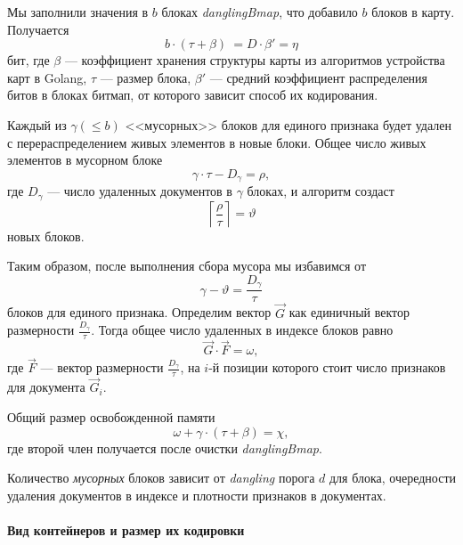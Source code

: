Мы заполнили значения в $b$ блоках \textit{danglingBmap}, что добавило $b$ блоков в карту.
Получается 
\begin{equation}
    \label{eta}
    b \cdot (\tau + \beta) ~= D \cdot \beta' = \eta
\end{equation}
бит, где $\beta$ — коэффициент хранения структуры карты из алгоритмов устройства
карт в Golang, $\tau$ — размер блока, $\beta'$ —  средний коэффициент
распределения битов в блоках битмап, от которого зависит способ их кодирования.

Каждый из $\gamma (\leq b)$ <<мусорных>> блоков для единого признака будет удален с перераспределением живых
элементов в новые блоки. Общее число живых элементов в мусорном блоке 
\begin{equation}
    \gamma \cdot \tau - D_{\gamma} = \rho,
\end{equation}
где $D_{\gamma}$ — число удаленных документов в $\gamma$ блоках, и алгоритм создаст
\begin{equation}
    \left\lceil \frac{\rho}{\tau}\right\rceil = \vartheta 
\end{equation}
новых блоков.

Таким образом, после выполнения сбора мусора мы избавимся от 
\begin{equation}
    \gamma - \vartheta = \frac{D_{\gamma}}{\tau}
\end{equation}
блоков для единого признака. Определим вектор $\vec{G}$ как единичный вектор
размерности $\frac{D_{\gamma}}{\tau}$. Тогда общее число удаленных в индексе блоков равно
\begin{equation}
    \vec{G} \cdot \vec{F} = \omega,
\end{equation}
где $\vec{F}$ — вектор размерности $\frac{D_{\gamma}}{\tau}$, на $i$-й позиции которого
стоит число признаков для документа $\vec{G}_i$.

Общий размер освобожденной памяти
\begin{equation}
    \omega + \gamma \cdot \left(\tau + \beta\right) = \chi,
\end{equation}
где второй член получается после очистки \textit{danglingBmap}.

Количество \textit{мусорных} блоков зависит от \textit{dangling} порога $d$ для
блока, очередности удаления документов в индексе и плотности признаков в
документах.

\paragraph{Вид контейнеров и размер их кодировки\\}

